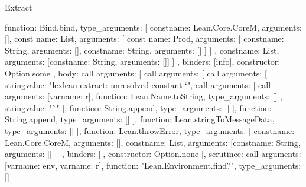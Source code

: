 \begin{lexlean}{Extract}
\begin{toolingmodule}
{{{{{{{                    function: Bind.bind,
                    type_arguments: [
                      const{name: Lean.Core.CoreM, arguments: []},
                      const{
                        name: List,
                        arguments: [
                          const{
                            name: Prod,
                            arguments: [
                              const{name: String, arguments: []},
                              const{name: String, arguments: []}
                            ]
                          }
                        ]
                      },
                      const{name: List, arguments: [const{name: String, arguments: []}]}
                    ]
                  },
                  binders: [info],
                  constructor: Option.some
                },
                {
                  body: call{
                    arguments: [
                      call{
                        arguments: [
                          call{
                            arguments: [
                              string{value: "lexlean-extract: unresolved constant `"},
                              call{
                                arguments: [
                                  call{
                                    arguments: [var{name: r}],
                                    function: Lean.Name.toString,
                                    type_arguments: []
                                  },
                                  string{value: "`"}
                                ],
                                function: String.append,
                                type_arguments: []
                              }
                            ],
                            function: String.append,
                            type_arguments: []
                          }
                        ],
                        function: Lean.stringToMessageData,
                        type_arguments: []
                      }
                    ],
                    function: Lean.throwError,
                    type_arguments: [
                      const{name: Lean.Core.CoreM, arguments: []},
                      const{name: List, arguments: [const{name: String, arguments: []}]}
                    ]
                  },
                  binders: [],
                  constructor: Option.none
                }
              ],
              scrutinee: call{
                arguments: [var{name: env}, var{name: r}],
                function: "Lean.Environment.find?",
                type_arguments: []
}}}}}}
\end{toolingmodule}
\end{lexlean}
